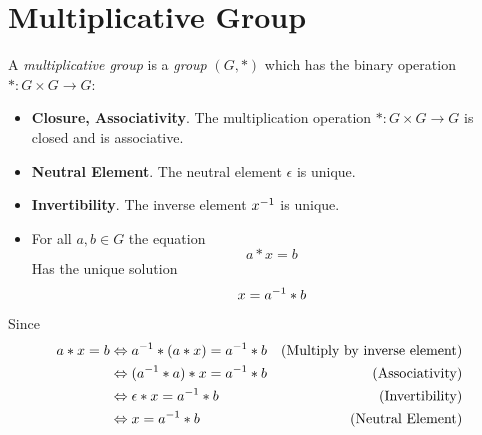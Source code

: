 \section{Multiplicative Group}

\begin{proposition}
    A \textit{multiplicative group} is a \textit{group} $(G, \ast)$ which has the binary operation $\ast \colon G \times G \to G$:
    \begin{itemize}
        \item \textbf{Closure, Associativity}. The multiplication operation $\ast \colon G \times G \to G$ is closed and is associative.
        \item \textbf{Neutral Element}. The neutral element $\epsilon$ is unique.
        \item \textbf{Invertibility}. The inverse element ${x}^{-1}$ is unique.
        \item For all $a, b \in G$ the equation
        \begin{equation}
            a \ast x = b
        \end{equation}
        Has the unique solution
        \begin{equation}
            x = {a}^{-1} \ast b
        \end{equation}
    \end{itemize}
    Since
    \begin{align}
        a \ast x = b &\Leftrightarrow {a}^{-1} \ast (a \ast x) = {a}^{-1} \ast b &\text{(Multiply by inverse element)} \\
        &\Leftrightarrow ({a}^{-1} \ast a) \ast x = {a}^{-1} \ast b &\text{(Associativity)} \\
        &\Leftrightarrow \epsilon \ast x = {a}^{-1} \ast b &\text{(Invertibility)} \\
        &\Leftrightarrow x = {a}^{-1} \ast b &\text{(Neutral Element)}
    \end{align}
\end{proposition}

